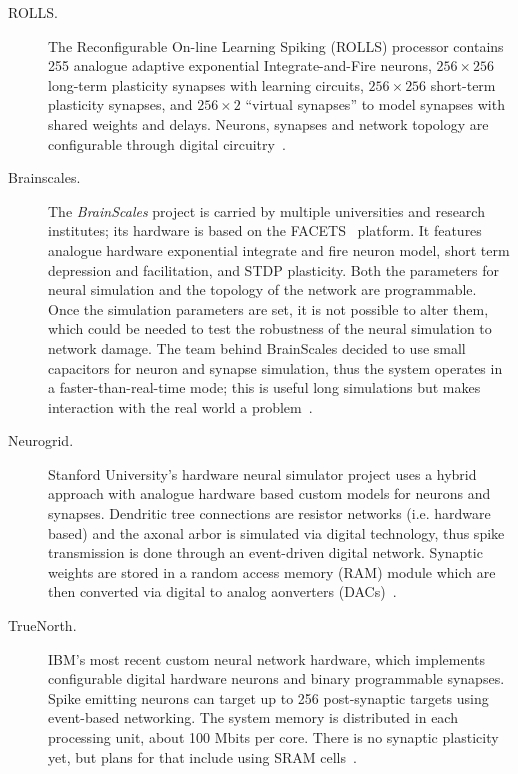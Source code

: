 \begin{description}
  
\item[ROLLS.] The Reconfigurable On-line Learning Spiking (ROLLS) processor 
contains 255 analogue adaptive exponential Integrate-and-Fire neurons, $256\times 
256$ long-term plasticity synapses with learning circuits, $256\times 256$ 
short-term plasticity synapses, and $256\times 2$ ``virtual synapses'' to model 
synapses with shared weights and delays. Neurons, synapses and network topology 
are configurable through digital circuitry~\cite{rolls-processor}.

\item[Brainscales.] The \emph{BrainScales} project is carried by multiple universities and research institutes; its hardware is based on the FACETS~ platform\cite{brainscales-schemmel2010wafer}. It features analogue hardware exponential integrate and fire neuron model, short term depression and facilitation, and STDP plasticity. Both the parameters for neural simulation and the topology of the network are programmable. Once the simulation parameters are set, it is not possible to alter them, which could be needed to test the robustness of the neural simulation to network damage. The team behind BrainScales decided to use small capacitors for neuron and synapse simulation, thus the system operates in a faster-than-real-time mode; this is useful long simulations but makes interaction with the real world a problem~\cite{neuro-platforms-summary-7159144,brainscales-homepage}. 

\item[Neurogrid.] Stanford University's hardware neural simulator project uses a hybrid approach with analogue hardware based custom models for neurons and synapses. Dendritic tree connections are resistor networks (i.e. hardware based) and the axonal arbor is simulated via  digital technology, thus spike transmission is done through an event-driven digital network. Synaptic weights are stored in a random access memory (RAM) module which are then converted via  digital to analog aonverters (DACs)~\cite{neurogrid-6805187}. 

\item[TrueNorth.] IBM's most recent custom neural network hardware, which implements configurable digital hardware neurons and binary programmable synapses. Spike emitting neurons can target up to 256 post-synaptic targets using event-based networking. The system memory is distributed in each processing unit, about 100 Mbits per core. There is no synaptic plasticity yet, but plans for that include using SRAM cells~\cite{truenorth-web}. 


\end{description}

